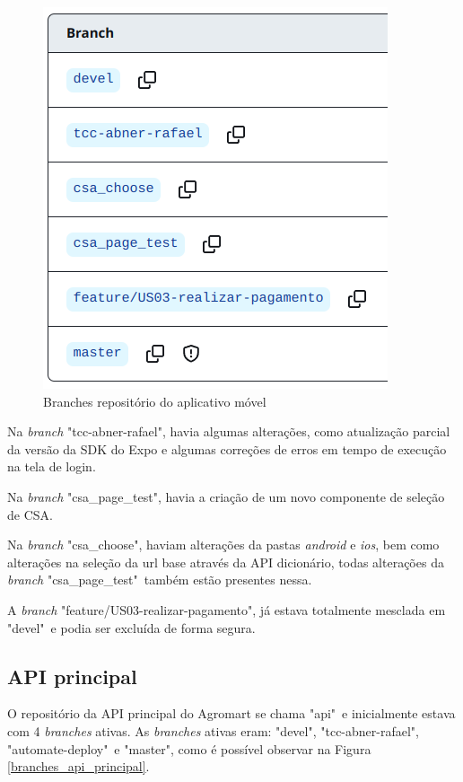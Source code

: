 \begin{figure}[h]
	\centering
	\includegraphics[keepaspectratio=true,scale=0.5]{figuras/banches_mobile.png}
	\caption{Branches repositório do aplicativo móvel}
  	\label{branches-mobile}
\end{figure}

Na \textit{branch} "tcc-abner-rafael", havia algumas alterações, como atualização parcial da versão da SDK do Expo e algumas correções de erros em tempo de execução na tela de login.

Na \textit{branch} "csa\_page\_test", havia a criação de um novo componente de seleção de CSA.

Na \textit{branch} "csa\_choose", haviam alterações da pastas \textit{android} e \textit{ios}, bem como alterações na seleção da url base através da API dicionário, todas alterações da \textit{branch} "csa\_page\_test"\ também estão presentes nessa.

A \textit{branch} "feature/US03-realizar-pagamento", já estava totalmente mesclada em "devel"\ e podia ser excluída de forma segura.

\subsection{API principal}
O repositório da API principal do Agromart se chama "api"\ e inicialmente estava com 4 \textit{branches} ativas. As \textit{branches} ativas eram: "devel", "tcc-abner-rafael", "automate-deploy"\ e "master", como é possível observar na Figura \ref{branches_api_principal}.

